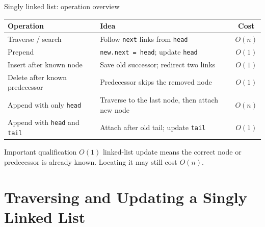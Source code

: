 \documentclass[aspectratio=169]{beamer}
\begin{document}
\begin{frame}{Singly linked list: operation overview}
\scriptsize
\begin{center}
\renewcommand{\arraystretch}{1.05}
\begin{tabular}{L{0.30\textwidth}L{0.42\textwidth}c}
\toprule
\textbf{Operation} & \textbf{Idea} & \textbf{Cost} \\
\midrule
Traverse / search & Follow \texttt{next} links from \texttt{head} & $O(n)$ \\
Prepend & \texttt{new.next = head}; update \texttt{head} & $O(1)$ \\
Insert after known node & Save old successor; redirect two links & $O(1)$ \\
Delete after known predecessor & Predecessor skips the removed node & $O(1)$ \\
Append with only \texttt{head} & Traverse to the last node, then attach new node & $O(n)$ \\
Append with \texttt{head} and \texttt{tail} & Attach after old tail; update \texttt{tail} & $O(1)$ \\
\bottomrule
\end{tabular}
\end{center}

\vspace{0.4em}
\begin{block}{Important qualification}
$O(1)$ linked-list update means the correct node or predecessor is already known. Locating it may still cost $O(n)$.
\end{block}
\end{frame}

\section{Traversing and Updating a Singly Linked List}
\end{document}
